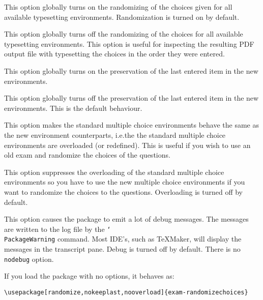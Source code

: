 \documentclass[12pt,a4paper]{exam}
\providecommand{\texorpdfstring}[2]{#1}
\newcommand{\bs}{\texorpdfstring{\char`\\}{}}
\begin{document}
\begin{description}[labelindent=2ex]
\item[randomize] This option globally turns on the randomizing of the choices given for all
available typesetting environments. Randomization is turned on by default.

\item[norandomize] This option globally turns off the randomizing of the choices for all
available typesetting environments. This option is useful for inspecting the resulting
PDF output file with typesetting the choices in the order they were entered.

\item[keeplast] This option globally turns on the preservation of the last entered
item in the new environments.

\item[nokeeplast] This option globally turns off the preservation of the last entered
item in the new environments. This is the default behaviour.

\item[overload] This option makes the standard multiple choice environments behave
the same as the new environment counterparts, i.e.\@ the the standard multiple choice
environments are overloaded (or redefined). This is useful if you wish to use an old
exam and randomize the choices of the questions.

\item[nooverload] This option suppresses the overloading of the standard multiple choice
environments so you have to use the new multiple choice environments if you want to
randomize the choices to the questions. Overloading is turned off by default.

\item[\texttt{debug}] This option causes the package to emit a lot of debug messages.
The messages are written to the log file by the \texttt{\bs{PackageWarning}}
command. Most IDE's, such as TeXMaker, will display the messages in the transcript pane.
Debug is turned off by default. There is no \texttt{nodebug} option.

\end{description}

If you load the package with no options, it behaves as:

\begin{lstlisting}
\usepackage[randomize,nokeeplast,nooverload]{exam-randomizechoices}
\end{lstlisting}
\end{document}
